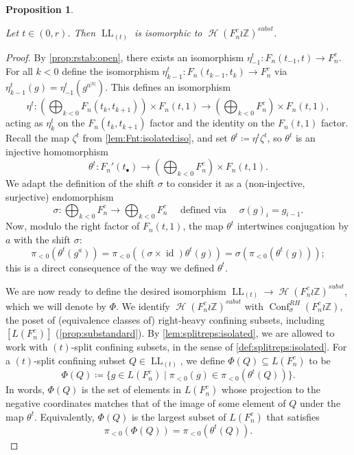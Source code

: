 \documentclass[reqno,12pt]{amsart}\setcounter{tocdepth}{1}
\newtheorem{proposition}[theorem]{Proposition}
\theoremstyle{definition}
\newcommand{\Z}{\mathbb{Z}}
\DeclareMathOperator{\id}{id}
\DeclareMathOperator{\Hyp}{\mathcal{H}}
\DeclareMathOperator{\Conf}{Conf}
\DeclareMathOperator{\LL}{LL}
\numberwithin{equation}{section}
\begin{document}
\begin{proposition}
\label{prop:isolatedlamps}

Let $t \in (0, r)$. Then $\LL_{(t)}$ is isomorphic to $\Hyp(F_n^c \wr \Z)^{subst}$.
\end{proposition}

\begin{proof}
By \cref{prop:rstab:open}, there exists an isomorphism $\eta^t_{-1} \colon F_n(t_{-1}, t) \to F_n^c$. For all $k < 0$ define the isomorphism $\eta^t_{k-1} \colon F_n(t_{k-1}, t_{k}) \to F_n^c$ via $\eta^t_{k-1}(g) = \eta^t_{-1}(g^{a^{|k|}})$. This defines an isomorphism
\[
\eta^t \colon \left( \bigoplus_{k < 0} F_n(t_{k}, t_{k+1}) \right) \times F_n(t, 1) \to \left( \bigoplus_{k < 0} F_n^c \right) \times F_n(t, 1),
\]
acting as $\eta_k^t$ on the $F_n(t_k,t_{k+1})$ factor and the identity on the $F_n(t,1)$ factor. Recall the map $\zeta^t$ from \cref{lem:Fnt:isolated:iso}, and set $\theta^t\coloneqq \eta^t\zeta^t$, so $\theta^t$ is an injective homomorphism
\[
\theta^t \colon F_n'(t_\bullet) \to \left( \bigoplus_{k < 0} F_n^c \right) \times F_n(t, 1).
\]
We adapt the definition of the shift $\sigma$ to consider it as a (non-injective, surjective) endomorphism
\[
\sigma \colon \bigoplus_{k < 0} F_n^c \to \bigoplus_{k < 0} F_n^c \quad\text{ defined via }\quad \sigma(g)_i = g_{i-1}.
\]
Now, modulo the right factor of $F_n(t, 1)$, the map $\theta^t$ intertwines conjugation by $a$ with the shift $\sigma$:
\begin{equation}
\label{intertwine}
\pi_{<0} (\theta^t(g^a)) = \pi_{<0}((\sigma\times\id)\theta^t (g)) = \sigma(\pi_{<0}(\theta^t(g)));
\end{equation}
this is a direct consequence of the way we defined $\theta^t$.

We are now ready to define the desired isomorphism $\LL_{(t)}\to \Hyp(F_n^c \wr \Z)^{subst}$, which we will denote by $\Phi$. We identify $\Hyp(F_n^c \wr \Z)^{subst}$ with $\Conf_\sigma^{RH}(F_n^c \wr \Z)$, the poset of (equivalence classes of) right-heavy confining subsets, including $[L(F_n^c)]$ (\cref{prop:substandard}). By \cref{lem:splitreps:isolated}, we are allowed to work with $(t)$-split confining subsets, in the sense of \cref{def:splitreps:isolated}. For a $(t)$-split confining subset $Q \in \LL_{(t)}$, we define $\Phi(Q) \subseteq L(F_n^c)$ to be
\[\Phi(Q) \coloneqq \{ g \in L(F_n^c) \mid \pi_{<0}(g) \in \pi_{<0}(\theta^t(Q)) \}.\]
In words, $\Phi(Q)$ is the set of elements in $L(F_n^c)$ whose projection to the negative coordinates matches that of the image of some element of $Q$ under the map $\theta^t$. Equivalently, $\Phi(Q)$ is the largest subset of $L(F_n^c)$ that satisfies
\[\pi_{<0}(\Phi(Q)) = \pi_{<0}(\theta^t(Q)).\]


\end{proof}
\end{document}
